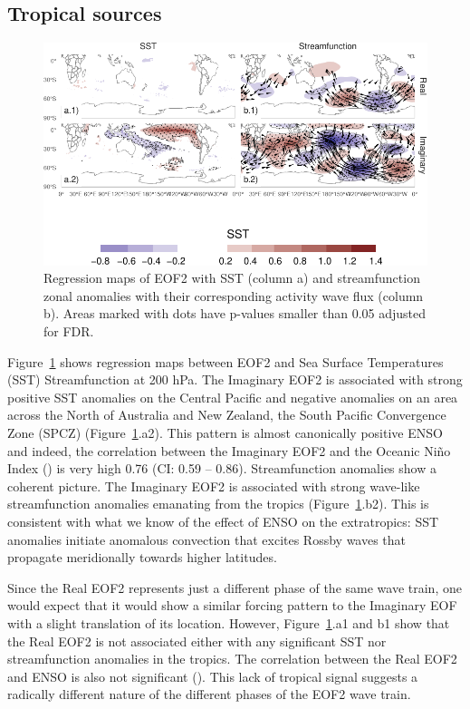 \documentclass[smallextended]{svjour3}       %
\begin{document}
\hypertarget{tropical-sources}{%
\subsection{Tropical sources}\label{tropical-sources}}



\begin{figure}
\centering
\includegraphics{../figures/sst-psi-2-1.pdf}
\caption{\label{fig:sst-psi-2}Regression maps of EOF2 with SST (column a) and streamfunction zonal anomalies with their corresponding activity wave flux (column b). Areas marked with dots have p-values smaller than 0.05 adjusted for FDR.}
\end{figure}

Figure~\ref{fig:sst-psi-2} shows regression maps between EOF2 and Sea Surface Temperatures (SST) Streamfunction at 200 hPa. The Imaginary EOF2 is associated with strong positive SST anomalies on the Central Pacific and negative anomalies on an area across the North of Australia and New Zealand, the South Pacific Convergence Zone (SPCZ) (Figure~\ref{fig:sst-psi-2}.a2). This pattern is almost canonically positive ENSO and indeed, the correlation between the Imaginary EOF2 and the Oceanic Niño Index (\citep{bamston1997}) is very high 0.76 (CI: 0.59 -- 0.86). Streamfunction anomalies show a coherent picture. The Imaginary EOF2 is associated with strong wave-like streamfunction anomalies emanating from the tropics (Figure~\ref{fig:sst-psi-2}.b2). This is consistent with what we know of the effect of ENSO on the extratropics: SST anomalies initiate anomalous convection that excites Rossby waves that propagate meridionally towards higher latitudes.

Since the Real EOF2 represents just a different phase of the same wave train, one would expect that it would show a similar forcing pattern to the Imaginary EOF with a slight translation of its location. However, Figure~\ref{fig:sst-psi-2}.a1 and b1 show that the Real EOF2 is not associated either with any significant SST nor streamfunction anomalies in the tropics. The correlation between the Real EOF2 and ENSO is also not significant (). This lack of tropical signal suggests a radically different nature of the different phases of the EOF2 wave train.
\end{document}
